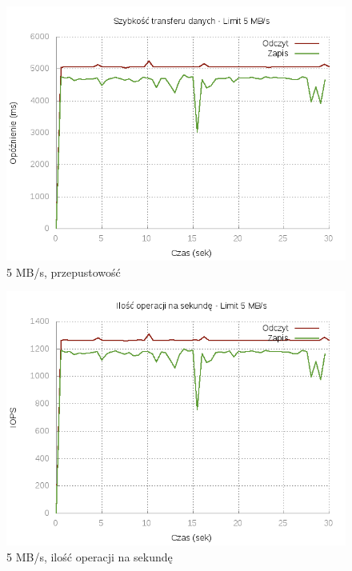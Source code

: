\begin{figure}[h]
	\centering
	\includegraphics[scale=0.9]{results/5_bw.png}
		\caption{5 MB/s, przepustowość}
    \label{fig:5-bw}
\end{figure}
\begin{figure}[h]
	\centering
	\includegraphics[scale=0.9]{results/5_iops.png}
		\caption{5 MB/s, ilość operacji na sekundę}
    \label{fig:5-iops}
\end{figure}
